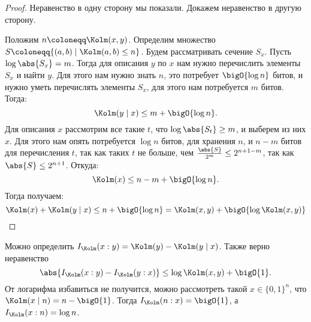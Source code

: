 \begin{proof}
    Неравенство в одну сторону мы показали. Докажем неравенство в другую сторону.
    
    Положим $n \coloneqq \Kolm(x, y)$. Определим множество $S \coloneqq \{(a, b) \mid \Kolm(a, b) \le n
    \}$. Будем рассматривать сечение $S_{x}$. Пусть $\log \abs{S_x} = m$. Тогда для описания $y$ по $x$
    нам нужно перечислить элементы $S_x$ и найти $y$. Для этого нам нужно знать $n$, это потребует
    $\bigO{\log n}$  битов, и нужно уметь перечислять элементы $S_x$, для этого нам потребуется $m$
    битов. Тогда:
    $$
        \Kolm(y \mid x) \le m + \bigO{\log n}.
    $$ 
    Для описания $x$ рассмотрим все такие $t$, что $\log \abs{S_t} \ge m$, и выберем из них $x$. Для
    этого нам опять потребуется $\log n$ битов, для хранения $n$, и $n - m$ битов для перечисления $t$,
    так как таких $t$ не больше, чем $\frac{\abs{S}}{2^m} \le 2^{n + 1 - m}$, так как $\abs{S} \le
    2^{n + 1}$. Откуда:
    $$
        \Kolm(x) \le n - m + \bigO{\log n}.
    $$ 
    Тогда получаем:
    $$
        \Kolm(x) + \Kolm(y \mid x) \le n + \bigO{\log n} = \Kolm(x, y) + \bigO{\log \Kolm(x, y)}
    $$
\end{proof}

Можно определить $I_{\Kolm}(x: y) = \Kolm(y) - \Kolm(y \mid x)$. Также верно неравенство 
$$
    \abs{I_{\Kolm}(x : y) - I_{\Kolm}(y : x)} \le \log \Kolm(x, y) + \bigO{1}.
$$ 
От логарифма избавиться не получится, можно рассмотреть такой $x \in \{0, 1\}^n$, что $\Kolm(x \mid n) =
n - \bigO{1}$. Тогда $I_{\Kolm}(n : x) = \bigO{1}$, а $I_{\Kolm}(x : n) = \log n$. 
